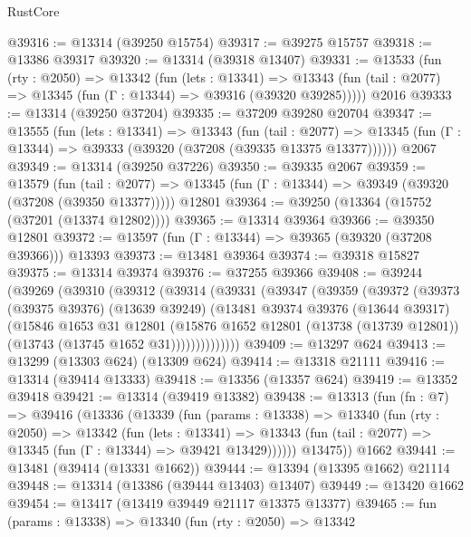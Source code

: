 \begin{lexlean}{RustCore}
\begin{coremodule}
@39316 := @13314 (@39250 @15754)
@39317 := @39275 @15757
@39318 := @13386 @39317
@39320 := @13314 (@39318 @13407)
@39331 := @13533
    (fun (rty : @2050) =>
    @13342
      (fun (lets : @13341) =>
      @13343 (fun (tail : @2077) => @13345 (fun (Γ : @13344) => @39316 (@39320 @39285)))))
    @2016
@39333 := @13314 (@39250 @37204)
@39335 := @37209 @39280 @20704
@39347 := @13555
    (fun (lets : @13341) =>
    @13343
      (fun (tail : @2077) =>
      @13345 (fun (Γ : @13344) => @39333 (@39320 (@37208 (@39335 @13375 @13377))))))
    @2067
@39349 := @13314 (@39250 @37226)
@39350 := @39335 @2067
@39359 := @13579
    (fun (tail : @2077) => @13345 (fun (Γ : @13344) => @39349 (@39320 (@37208 (@39350 @13377)))))
    @12801
@39364 := @39250 (@13364 (@15752 (@37201 (@13374 @12802))))
@39365 := @13314 @39364
@39366 := @39350 @12801
@39372 := @13597 (fun (Γ : @13344) => @39365 (@39320 (@37208 @39366))) @13393
@39373 := @13481 @39364
@39374 := @39318 @15827
@39375 := @13314 @39374
@39376 := @37255 @39366
@39408 := @39244
    (@39269
      (@39310
        (@39312
          (@39314
            (@39331
              (@39347
                (@39359
                  (@39372
                    (@39373
                      (@39375 @39376)
                      (@13639 @39249)
                      (@13481
                        @39374
                        @39376
                        (@13644 @39317)
                        (@15846
                          @1653
                          @31
                          @12801
                          (@15876
                            @1652
                            @12801
                            (@13738 (@13739 @12801))
                            (@13743 (@13745 @1652 @31))))))))))))))
@39409 := @13297 @624
@39413 := @13299 (@13303 @624) (@13309 @624)
@39414 := @13318 @21111
@39416 := @13314 (@39414 @13333)
@39418 := @13356 (@13357 @624)
@39419 := @13352 @39418
@39421 := @13314 (@39419 @13382)
@39438 := @13313
    (fun (fn : @7) =>
    @39416
      (@13336
        (@13339
          (fun (params : @13338) =>
          @13340
            (fun (rty : @2050) =>
            @13342
              (fun (lets : @13341) =>
              @13343 (fun (tail : @2077) => @13345 (fun (Γ : @13344) => @39421 @13429))))))
        @13475))
    @1662
@39441 := @13481 (@39414 (@13331 @1662))
@39444 := @13394 (@13395 @1662) @21114
@39448 := @13314 (@13386 (@39444 @13403) @13407)
@39449 := @13420 @1662
@39454 := @13417 (@13419 @39449 @21117 @13375 @13377)
@39465 := fun (params : @13338) =>
  @13340
    (fun (rty : @2050) =>
    @13342

\end{coremodule}
\end{lexlean}
